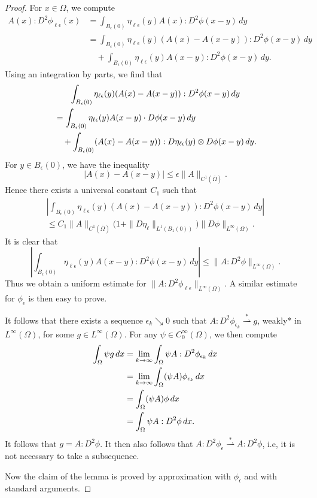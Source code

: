 \documentclass[10pt,a4paper]{amsart}
\let\div\relax\DeclareMathOperator{\div}{div}
\begin{document}
\begin{proof}
For $x \in \Omega$, we compute
\[
\begin{split}
A(x) : D^2 \phi_{\ell\epsilon}(x) &= \int_{B_\epsilon(0)} \eta_{\ell\epsilon}(y) A(x) : D^2\phi(x - y) \, dy \\
& = \int_{B_\epsilon(0)} \eta_{\ell\epsilon}(y) (A(x) - A(x - y)) : D^2\phi(x - y) \, dy \\
& \quad + \int_{B_\epsilon(0)} \eta_{\ell\epsilon}(y) A(x - y) : D^2\phi(x - y) \, dy.
\end{split}
\]
Using an integration by parts, we find that
\begin{multline*}
\int_{B_\epsilon(0)} \eta_{\ell\epsilon}(y) (A(x) - A(x - y)) : D^2\phi(x - y) \, dy \\
\begin{aligned}
&= \int_{B_\epsilon(0)} \eta_{\ell\epsilon}(y) \div A(x - y) \cdot D\phi(x - y) \, dy \\
& \quad + \int_{B_\epsilon(0)} (A(x) - A(x - y)) : D\eta_{\ell\epsilon}(y) \otimes D\phi(x - y) \, dy.
\end{aligned}
\end{multline*}
For $y \in B_\epsilon(0)$, we have the inequality
\[
|A(x) - A(x - y)| \le \epsilon \|A\|_{C^1(\overline{\Omega})}.
\]
Hence there exists a universal constant $C_1$ such that
\begin{multline*}
\left|\int_{B_\epsilon(0)} \eta_{\ell\epsilon}(y) (A(x) - A(x - y)) : D^2\phi(x - y) \, dy\right| \\
\le C_1\|A\|_{C^1(\overline{\Omega})} \bigl(1 + \|D\eta_\ell\|_{L^1(B_1(0))}\bigr) \|D\phi\|_{L^\infty(\Omega)}.
\end{multline*}
It is clear that
\[
\left|\int_{B_\epsilon(0)} \eta_{\ell\epsilon}(y) A(x - y) : D^2\phi(x - y) \, dy\right| \le \|A : D^2 \phi\|_{L^\infty(\Omega)}.
\]
Thus we obtain a uniform estimate for $\|A : D^2\phi_{\ell\epsilon}\|_{L^\infty(\Omega)}$. A similar estimate for $\phi_\epsilon$ is then easy to prove.

It follows that there exists a sequence $\epsilon_k \searrow 0$ such that
$A : D^2\phi_{\epsilon_k} \stackrel{*}{\rightharpoonup} g$, weakly* in
$L^\infty(\Omega)$, for some $g \in L^\infty(\Omega)$. For any $\psi \in C_0^\infty(\Omega)$, we then compute
\[
\begin{split}
\int_\Omega \psi g \, dx &= \lim_{k \to \infty} \int_\Omega \psi A : D^2 \phi_{\epsilon_k} \, dx \\
&= \lim_{k \to \infty} \int_\Omega \div \div (\psi A) \phi_{\epsilon_k} \, dx \\
&= \int_\Omega \div \div (\psi A) \phi \, dx \\
&= \int_\Omega \psi A : D^2 \phi \, dx.
\end{split}
\]
It follows that $g = A : D^2\phi$. It then also follows that $A : D^2\phi_\epsilon \stackrel{*}{\rightharpoonup} A : D^2\phi$, i.e, it
is not necessary to take a subsequence.

Now the claim of the lemma is proved by approximation with $\phi_\epsilon$
and with standard arguments.
\end{proof}
\end{document}
